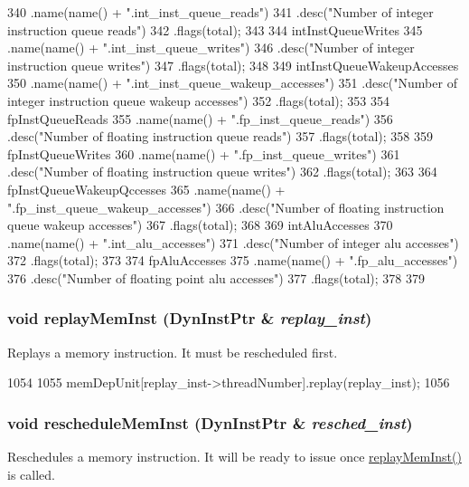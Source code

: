 \begin{DoxyCode}
{340         .name(name() + ".int_inst_queue_reads")
341         .desc("Number of integer instruction queue reads")
342         .flags(total);
343 
344     intInstQueueWrites
345         .name(name() + ".int_inst_queue_writes")
346         .desc("Number of integer instruction queue writes")
347         .flags(total);
348 
349     intInstQueueWakeupAccesses
350         .name(name() + ".int_inst_queue_wakeup_accesses")
351         .desc("Number of integer instruction queue wakeup accesses")
352         .flags(total);
353 
354     fpInstQueueReads
355         .name(name() + ".fp_inst_queue_reads")
356         .desc("Number of floating instruction queue reads")
357         .flags(total);
358 
359     fpInstQueueWrites
360         .name(name() + ".fp_inst_queue_writes")
361         .desc("Number of floating instruction queue writes")
362         .flags(total);
363 
364     fpInstQueueWakeupQccesses
365         .name(name() + ".fp_inst_queue_wakeup_accesses")
366         .desc("Number of floating instruction queue wakeup accesses")
367         .flags(total);
368 
369     intAluAccesses
370         .name(name() + ".int_alu_accesses")
371         .desc("Number of integer alu accesses")
372         .flags(total);
373 
374     fpAluAccesses
375         .name(name() + ".fp_alu_accesses")
376         .desc("Number of floating point alu accesses")
377         .flags(total);
378 
379 }
\end{DoxyCode}
\hypertarget{classInstructionQueue_af6c215567b7a5a496ef245cd86df2e62}{
\subsubsection[{replayMemInst}]{\setlength{\rightskip}{0pt plus 5cm}void replayMemInst ({\bf DynInstPtr} \& {\em replay\_\-inst})}}
\label{classInstructionQueue_af6c215567b7a5a496ef245cd86df2e62}
Replays a memory instruction. It must be rescheduled first. 


\begin{DoxyCode}
1054 {
1055     memDepUnit[replay_inst->threadNumber].replay(replay_inst);
1056 }
\end{DoxyCode}
\hypertarget{classInstructionQueue_afdf61c4d00a7c48449b14c6f525e3869}{
\subsubsection[{rescheduleMemInst}]{\setlength{\rightskip}{0pt plus 5cm}void rescheduleMemInst ({\bf DynInstPtr} \& {\em resched\_\-inst})}}
\label{classInstructionQueue_afdf61c4d00a7c48449b14c6f525e3869}
Reschedules a memory instruction. It will be ready to issue once \hyperlink{classInstructionQueue_af6c215567b7a5a496ef245cd86df2e62}{replayMemInst()} is called. 


